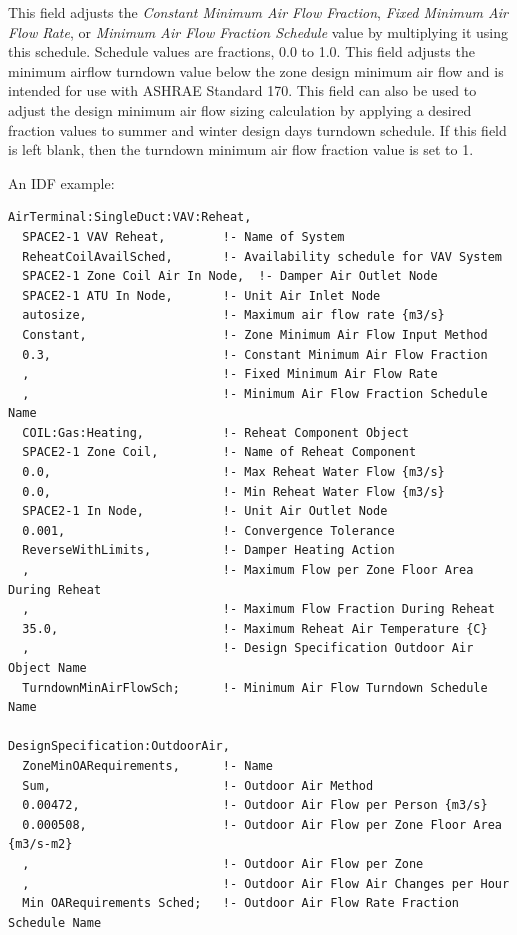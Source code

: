 This field adjusts the \textit{Constant Minimum Air Flow Fraction}, \textit{Fixed Minimum Air Flow Rate}, or \textit{Minimum Air Flow Fraction Schedule} value by multiplying it using this schedule. Schedule values are fractions, 0.0 to 1.0. This field adjusts the minimum airflow turndown value below the zone design minimum air flow and is intended for use with ASHRAE Standard 170. This field can also be used to adjust the design minimum air flow sizing calculation by applying a desired fraction values to summer and winter design days turndown schedule. If this field is left blank, then the turndown minimum air flow fraction value is set to 1.

An IDF example:

\begin{lstlisting}
AirTerminal:SingleDuct:VAV:Reheat,
  SPACE2-1 VAV Reheat,        !- Name of System
  ReheatCoilAvailSched,       !- Availability schedule for VAV System
  SPACE2-1 Zone Coil Air In Node,  !- Damper Air Outlet Node
  SPACE2-1 ATU In Node,       !- Unit Air Inlet Node
  autosize,                   !- Maximum air flow rate {m3/s}
  Constant,                   !- Zone Minimum Air Flow Input Method
  0.3,                        !- Constant Minimum Air Flow Fraction
  ,                           !- Fixed Minimum Air Flow Rate
  ,                           !- Minimum Air Flow Fraction Schedule Name
  COIL:Gas:Heating,           !- Reheat Component Object
  SPACE2-1 Zone Coil,         !- Name of Reheat Component
  0.0,                        !- Max Reheat Water Flow {m3/s}
  0.0,                        !- Min Reheat Water Flow {m3/s}
  SPACE2-1 In Node,           !- Unit Air Outlet Node
  0.001,                      !- Convergence Tolerance
  ReverseWithLimits,          !- Damper Heating Action
  ,                           !- Maximum Flow per Zone Floor Area During Reheat
  ,                           !- Maximum Flow Fraction During Reheat
  35.0,                       !- Maximum Reheat Air Temperature {C}
  ,                           !- Design Specification Outdoor Air Object Name
  TurndownMinAirFlowSch;      !- Minimum Air Flow Turndown Schedule Name

DesignSpecification:OutdoorAir,
  ZoneMinOARequirements,      !- Name
  Sum,                        !- Outdoor Air Method
  0.00472,                    !- Outdoor Air Flow per Person {m3/s}
  0.000508,                   !- Outdoor Air Flow per Zone Floor Area {m3/s-m2}
  ,                           !- Outdoor Air Flow per Zone
  ,                           !- Outdoor Air Flow Air Changes per Hour
  Min OARequirements Sched;   !- Outdoor Air Flow Rate Fraction Schedule Name


\end{lstlisting}
